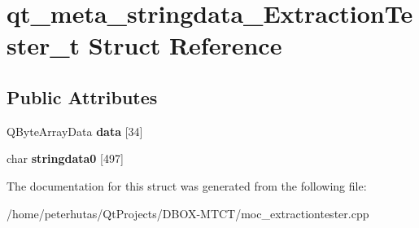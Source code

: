 \hypertarget{structqt__meta__stringdata___extraction_tester__t}{}\section{qt\+\_\+meta\+\_\+stringdata\+\_\+\+Extraction\+Tester\+\_\+t Struct Reference}
\label{structqt__meta__stringdata___extraction_tester__t}
\subsection*{Public Attributes}
\begin{DoxyCompactItemize}
\item 
\mbox{\label{structqt__meta__stringdata___extraction_tester__t_a08b45dc00ad8c43c8e22356820a3310c}} 
Q\+Byte\+Array\+Data {\bfseries data} \mbox{[}34\mbox{]}
\item 
\mbox{\label{structqt__meta__stringdata___extraction_tester__t_a165cd73255eaa7cdbed34112f8d57c4d}} 
char {\bfseries stringdata0} \mbox{[}497\mbox{]}
\end{DoxyCompactItemize}


The documentation for this struct was generated from the following file\+:\begin{DoxyCompactItemize}
\item 
/home/peterhutas/\+Qt\+Projects/\+D\+B\+O\+X-\/\+M\+T\+C\+T/moc\+\_\+extractiontester.\+cpp\end{DoxyCompactItemize}
